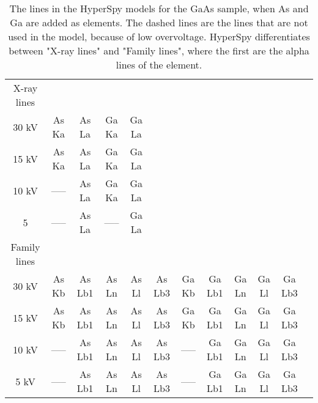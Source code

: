 
\begin{table}[p]
    \centering
    \caption{
        The lines in the HyperSpy models for the GaAs sample, when As and Ga are added as elements.
        The dashed lines are the lines that are not used in the model, because of low overvoltage.
        HyperSpy differentiates between "X-ray lines" and "Family lines", where the first are the alpha lines of the element.
    }
    \label{tab:results:model_lines}
    \begin{tabular}{c|ccccccccccc}
        X-ray lines  &       &        &       &       &        &       &        &       &       &        \\
        30 kV        & As Ka & As La  & Ga Ka & Ga La &        &       &        &       &       &        \\
        15 kV        & As Ka & As La  & Ga Ka & Ga La &        &       &        &       &       &        \\
        10 kV        & ----- & As La  & Ga Ka & Ga La &        &       &        &       &       &        \\
        5            & ----- & As La  & ----- & Ga La &        &       &        &       &       &        \\
        \hline
        Family lines &       &        &       &       &        &       &        &       &       &        \\
        30 kV        & As Kb & As Lb1 & As Ln & As Ll & As Lb3 & Ga Kb & Ga Lb1 & Ga Ln & Ga Ll & Ga Lb3 \\
        15 kV        & As Kb & As Lb1 & As Ln & As Ll & As Lb3 & Ga Kb & Ga Lb1 & Ga Ln & Ga Ll & Ga Lb3 \\
        10 kV        & ----- & As Lb1 & As Ln & As Ll & As Lb3 & ----- & Ga Lb1 & Ga Ln & Ga Ll & Ga Lb3 \\
        5  kV        & ----- & As Lb1 & As Ln & As Ll & As Lb3 & ----- & Ga Lb1 & Ga Ln & Ga Ll & Ga Lb3
    \end{tabular}
\end{table}